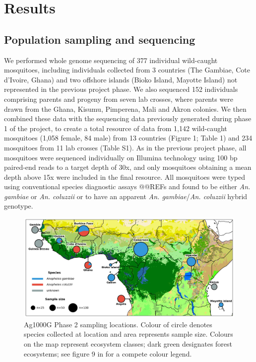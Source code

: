 \documentclass[a4paper,11pt,abstracton,hidelinks]{scrartcl}
\begin{document}
\section*{Results}


\subsection*{Population sampling and sequencing}


%
We performed whole genome sequencing of 377 individual wild-caught mosquitoes, including individuals collected from 3 countries (The Gambiae, Cote d'Ivoire, Ghana) and two offshore islands (Bioko Island, Mayotte Island) not represented in the previous project phase. 
%
We also sequenced 152 individuals comprising parents and progeny from seven lab crosses, where parents were drawn from the Ghana, Kisumu, Pimperena, Mali and Akron colonies. 
%
We then combined these data with the sequencing data previously generated during phase 1 of the project, to create a total resource of data from 1,142 wild-caught mosquitoes (1,058 female, 84 male) from 13 countries (Figure 1; Table 1) and 234 mosquitoes from 11 lab crosses (Table S1). 
%
As in the previous project phase, all mosquitoes were sequenced individually on Illumina technology using 100 bp paired-end reads to a target depth of 30x, and only mosquitoes obtaining a mean depth above 15x were included in the final resource. 
%
All mosquitoes were typed using conventional species diagnostic assays @@REFs and found to be either \textit{An. gambiae} or \textit{An. coluzzii} or to have an apparent \textit{An. gambiae}/\textit{An. coluzzii} hybrid genotype. 


\begin{figure}[H]
	\begin{center}
		\includegraphics*[width=5.8in]{artwork/collection_site_map.jpg}
	\end{center}
	\caption{Ag1000G Phase 2 sampling locations. Colour of circle denotes species collected at location and area represents sample size. Colours on the map represent ecosystem classes; dark green designates forest ecosystems; see figure 9 in \cite{sayre2013} for a compete colour legend.}
	\label{sample_map}
\end{figure}
\end{document}
